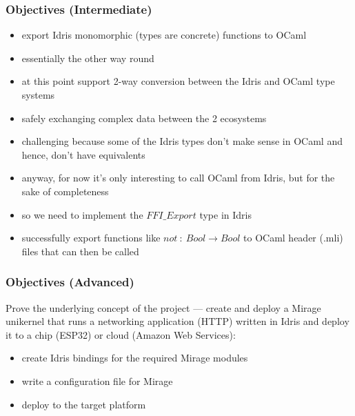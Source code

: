 \documentclass{beamer}
\begin{document}
\begin{frame}
	\frametitle{Objectives (Intermediate)}

	\begin{itemize}
		\item export Idris monomorphic (types are concrete) functions
		      to OCaml
		\item essentially the other way round
		\item at this point support 2-way conversion between
		      the Idris and OCaml type systems
		\item safely exchanging complex data between the 2 ecosystems
		\item challenging because some of the Idris types don't make
		      sense in OCaml and hence, don't have equivalents
		\item anyway, for now it's only interesting to call OCaml
		      from Idris, but for the sake of completeness
		\item so we need to implement the $FFI\_Export$ type in Idris
		\item successfully export functions like
		      $not \ : \ Bool \rightarrow Bool$ to OCaml header (.mli)
		      files that can then be called
	\end{itemize}
\end{frame}


\begin{frame}
	\frametitle{Objectives (Advanced)}

	Prove the underlying concept of the project --- create and deploy a Mirage unikernel that runs a networking
	application (HTTP) written in Idris and deploy it to a chip (ESP32) or cloud (Amazon Web Services):

	\begin{itemize}
		\item create Idris bindings for the required Mirage modules
		\item write a configuration file for Mirage
		\item deploy to the target platform
	\end{itemize}
\end{frame}
\end{document}
